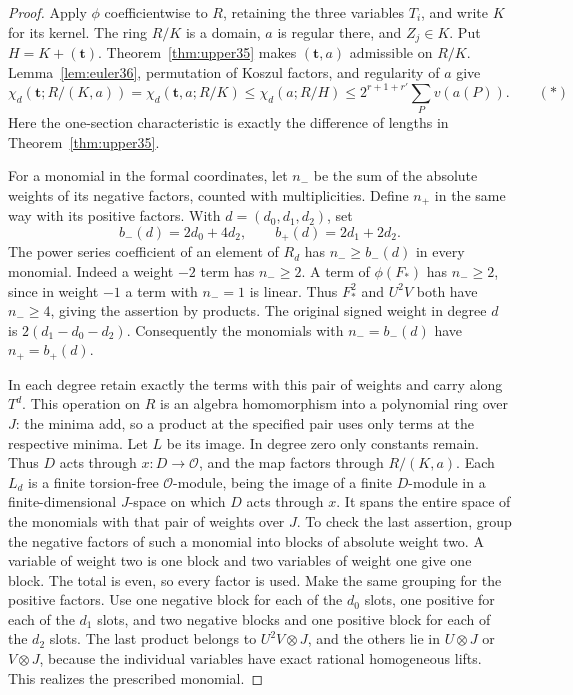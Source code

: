 \documentclass[a4paper,11pt]{article}
\theoremstyle{definition}
\theoremstyle{remark}
\numberwithin{equation}{section}
\newcommand{\OO}{\mathcal O}
\begin{document}
\begin{proof}
Apply \(\phi\) coefficientwise to \(R\), retaining the three variables \(T_i\), and write \(K\) for its kernel. The ring \(R/K\) is a domain, \(a\) is regular there, and \(Z_j\in K\). Put \(H=K+(\mathbf t)\). Theorem~\ref{thm:upper35} makes \((\mathbf t,a)\) admissible on \(R/K\). Lemma~\ref{lem:euler36}, permutation of Koszul factors, and regularity of \(a\) give
\begin{equation*}
 \chi_d(\mathbf t;R/(K,a))=\chi_d(\mathbf t,a;R/K)
                \le\chi_d(a;R/H)
                \le 2^{r+1+r'}\sum_P v(a(P)).                 \qquad(\ast)
\end{equation*}
Here the one-section characteristic is exactly the difference of lengths in Theorem~\ref{thm:upper35}.

For a monomial in the formal coordinates, let \(n_-\) be the sum of the absolute weights of its negative factors, counted with multiplicities. Define \(n_+\) in the same way with its positive factors. With \(d=(d_0,d_1,d_2)\), set
\[
               b_-(d)=2d_0+4d_2,\qquad b_+(d)=2d_1+2d_2 .
\]
The power series coefficient of an element of \(R_d\) has \(n_-\ge b_-(d)\) in every monomial. Indeed a weight \(-2\) term has \(n_-\ge2\). A term of \(\phi(F_*)\) has \(n_-\ge2\), since in weight \(-1\) a term with \(n_-=1\) is linear. Thus \(F_*^2\) and \(U^2V\) both have \(n_-\ge4\), giving the assertion by products. The original signed weight in degree \(d\) is \(2(d_1-d_0-d_2)\). Consequently the monomials with \(n_-=b_-(d)\) have \(n_+=b_+(d)\).

In each degree retain exactly the terms with this pair of weights and carry along \(T^d\). This operation on \(R\) is an algebra homomorphism into a polynomial ring over \(J\): the minima add, so a product at the specified pair uses only terms at the respective minima. Let \(L\) be its image. In degree zero only constants remain. Thus \(D\) acts through \(x:D\to\OO\), and the map factors through \(R/(K,a)\). Each \(L_d\) is a finite torsion-free \(\OO\)-module, being the image of a finite \(D\)-module in a finite-dimensional \(J\)-space on which \(D\) acts through \(x\). It spans the entire space of the monomials with that pair of weights over \(J\). To check the last assertion, group the negative factors of such a monomial into blocks of absolute weight two. A variable of weight two is one block and two variables of weight one give one block. The total is even, so every factor is used. Make the same grouping for the positive factors. Use one negative block for each of the \(d_0\) slots, one positive for each of the \(d_1\) slots, and two negative blocks and one positive block for each of the \(d_2\) slots. The last product belongs to \(U^2V\otimes J\), and the others lie in \(U\otimes J\) or \(V\otimes J\), because the individual variables have exact rational homogeneous lifts. This realizes the prescribed monomial.


\end{proof}
\end{document}

